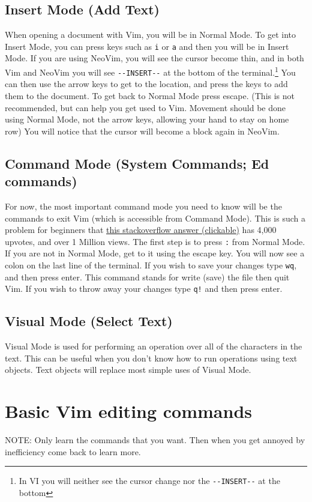 \documentclass[11pt]{article}
\begin{document}
\subsection{Insert Mode (Add Text)}
\label{sec:orgb5d68c2}
When opening a document with Vim, you will be in Normal Mode. To get into Insert
Mode, you can press keys such as \texttt{i} or \texttt{a} and then you will be in Insert Mode.
If you are using NeoVim, you will see the cursor become thin, and in both Vim
and NeoVim you will see \texttt{-{}-INSERT-{}-} at the bottom of the terminal.\footnote{In VI you will neither see the cursor change nor the \texttt{-{}-INSERT-{}-} at the bottom} You
can then use the arrow keys to get to the location, and press the keys to add
them to the document. To get back to Normal Mode press escape. (This is not
recommended, but can help you get used to Vim. Movement should be done using
Normal Mode, not the arrow keys, allowing your hand to stay on home row) You
will notice that the cursor will become a block again in NeoVim.
\subsection{Command Mode (System Commands; Ed commands)}
\label{sec:org21e5874}
For now, the most important command mode you need to know will be the commands
to exit Vim (which is accessible from Command Mode). This is such a problem for
beginners that \href{https://stackoverflow.com/questions/11828270/how-to-exit-the-vim-editor}{this stackoverflow answer (clickable)} has 4,000 upvotes, and over
1 Million views. The first step is to press \texttt{:} from Normal Mode. If you are not
in Normal Mode, get to it using the escape key. You will now see a colon on the
last line of the terminal. If you wish to save your changes type \texttt{wq}, and then
press enter. This command stands for write (save) the file then quit Vim. If you
wish to throw away your changes type \texttt{q!} and then press enter.
\subsection{Visual Mode (Select Text)}
\label{sec:org3e0c27c}
Visual Mode is used for performing an operation over all of the characters in
the text. This can be useful when you don't know how to run operations using
text objects. Text objects will replace most simple uses of Visual Mode.
\section{Basic Vim editing commands}
\label{sec:orgbbc6b49}
NOTE: Only learn the commands that you want. Then when you get annoyed by
inefficiency come back to learn more.
\end{document}
